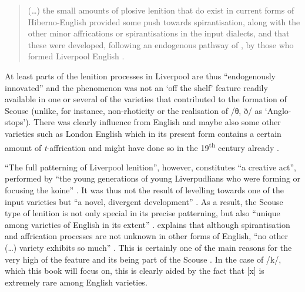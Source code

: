 	\begin{quote}
		(\ldots) the small amounts of plosive lenition that do exist in current forms of Hiberno-English provided some push towards spirantisation, along with the other minor affrications or spirantisations in the input dialects, and that these were developed, following an endogenous pathway of , by those who formed Liverpool English \citeyearpar[131]{honeybone2007}.
	\end{quote}

At least parts of the lenition processes in Liverpool are thus ``endogenously innovated'' \citep[130]{honeybone2007} and the phenomenon was not an `off the shelf' feature readily available in one or several of the varieties that contributed to the formation of Scouse (unlike, for instance, non-rhoticity or the realisation of /θ, ð/ as `Anglo- stops').
There was clearly influence from  English and maybe also some other varieties such as London English which in its present form contains a certain amount of \emph{t}-affrication and might have done so in the 19\textsuperscript{th} century already \parencite[cf.][132]{honeybone2007}.

``The full patterning of Liverpool lenition'', however, constitutes ``a creative act'', performed by ``the young generations of young Liverpudlians who were forming or focusing the koine'' \parencite[132]{honeybone2007}.
It was thus not the result of levelling towards one of the input varieties but ``a novel, divergent development'' \parencite[132]{honeybone2007}.
As a result, the Scouse type of lenition is not only special in its precise patterning, but also ``unique among varieties of English in its extent'' \parencite[132]{honeybone2007}.
\textcite[130]{honeybone2007} explains that although spirantisation and affrication processes are not unknown in other forms of English, ``no other (\ldots) variety exhibits so much'' \parencite[130]{honeybone2007}.
This is certainly one of the main reasons for the very high  of the feature and its being part of the Scouse .
In the case of /k/, which this book will focus on, this is clearly aided by the fact that [x] is extremely rare among English varieties.

